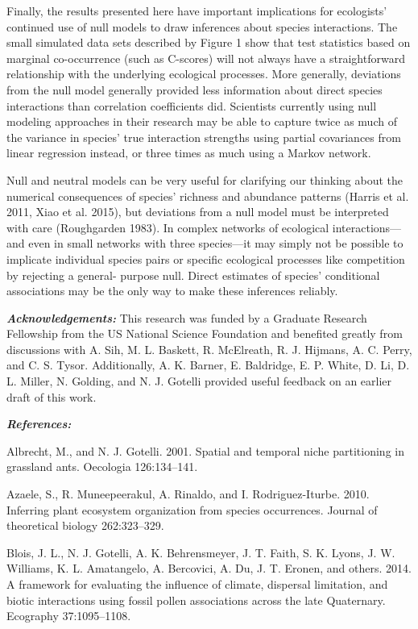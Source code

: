 \documentclass[12pt,]{article}
\begin{document}
\begin{spacing}{1.9}
\begin{flushleft}
Finally, the results presented here have important implications for
ecologists' continued use of null models to draw inferences about
species interactions. The small simulated data sets described by Figure
1 show that test statistics based on marginal co-occurrence (such as
C-scores) will not always have a straightforward relationship with the
underlying ecological processes. More generally, deviations from the
null model generally provided less information about direct species
interactions than correlation coefficients did. Scientists currently
using null modeling approaches in their research may be able to capture
twice as much of the variance in species' true interaction strengths
using partial covariances from linear regression instead, or three times
as much using a Markov network.

Null and neutral models can be very useful for clarifying our thinking
about the numerical consequences of species' richness and abundance
patterns (Harris et al. 2011, Xiao et al. 2015), but deviations from a
null model must be interpreted with care (Roughgarden 1983). In complex
networks of ecological interactions---and even in small networks with
three species---it may simply not be possible to implicate individual
species pairs or specific ecological processes like competition by
rejecting a general- purpose null. Direct estimates of species'
conditional associations may be the only way to make these inferences
reliably.

\textbf{\emph{Acknowledgements:}} This research was funded by a Graduate
Research Fellowship from the US National Science Foundation and
benefited greatly from discussions with A. Sih, M. L. Baskett, R.
McElreath, R. J. Hijmans, A. C. Perry, and C. S. Tysor. Additionally, A.
K. Barner, E. Baldridge, E. P. White, D. Li, D. L. Miller, N. Golding,
and N. J. Gotelli provided useful feedback on an earlier draft of this
work.

\textbf{\emph{References:}}


Albrecht, M., and N. J. Gotelli. 2001. Spatial and temporal niche
partitioning in grassland ants. Oecologia 126:134--141.

Azaele, S., R. Muneepeerakul, A. Rinaldo, and I. Rodriguez-Iturbe. 2010.
Inferring plant ecosystem organization from species occurrences. Journal
of theoretical biology 262:323--329.

Blois, J. L., N. J. Gotelli, A. K. Behrensmeyer, J. T. Faith, S. K.
Lyons, J. W. Williams, K. L. Amatangelo, A. Bercovici, A. Du, J. T.
Eronen, and others. 2014. A framework for evaluating the influence of
climate, dispersal limitation, and biotic interactions using fossil
pollen associations across the late Quaternary. Ecography 37:1095--1108.


\end{flushleft}
\end{spacing}
\end{document}
